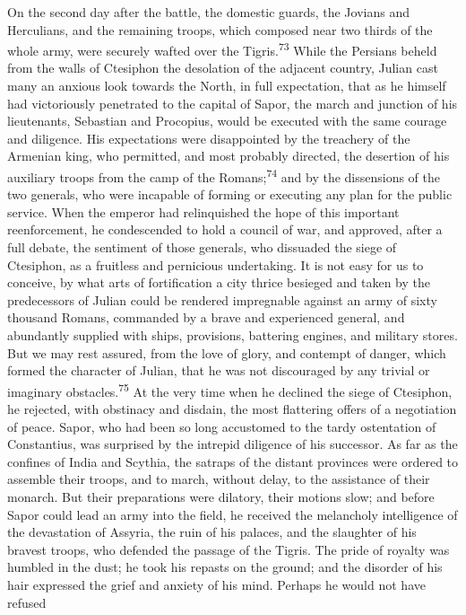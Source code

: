 On the second day after the battle, the domestic guards, the
Jovians and Herculians, and the remaining troops, which composed
near two thirds of the whole army, were securely wafted over the
Tigris.\textsuperscript{73} While the Persians beheld from the walls of Ctesiphon
the desolation of the adjacent country, Julian cast many an
anxious look towards the North, in full expectation, that as he
himself had victoriously penetrated to the capital of Sapor, the
march and junction of his lieutenants, Sebastian and Procopius,
would be executed with the same courage and diligence. His
expectations were disappointed by the treachery of the Armenian
king, who permitted, and most probably directed, the desertion of
his auxiliary troops from the camp of the Romans;\textsuperscript{74} and by the
dissensions of the two generals, who were incapable of forming or
executing any plan for the public service. When the emperor had
relinquished the hope of this important reenforcement, he
condescended to hold a council of war, and approved, after a full
debate, the sentiment of those generals, who dissuaded the siege
of Ctesiphon, as a fruitless and pernicious undertaking. It is
not easy for us to conceive, by what arts of fortification a city
thrice besieged and taken by the predecessors of Julian could be
rendered impregnable against an army of sixty thousand Romans,
commanded by a brave and experienced general, and abundantly
supplied with ships, provisions, battering engines, and military
stores. But we may rest assured, from the love of glory, and
contempt of danger, which formed the character of Julian, that he
was not discouraged by any trivial or imaginary obstacles.\textsuperscript{75} At
the very time when he declined the siege of Ctesiphon, he
rejected, with obstinacy and disdain, the most flattering offers
of a negotiation of peace. Sapor, who had been so long accustomed
to the tardy ostentation of Constantius, was surprised by the
intrepid diligence of his successor. As far as the confines of
India and Scythia, the satraps of the distant provinces were
ordered to assemble their troops, and to march, without delay, to
the assistance of their monarch. But their preparations were
dilatory, their motions slow; and before Sapor could lead an army
into the field, he received the melancholy intelligence of the
devastation of Assyria, the ruin of his palaces, and the
slaughter of his bravest troops, who defended the passage of the
Tigris. The pride of royalty was humbled in the dust; he took his
repasts on the ground; and the disorder of his hair expressed the
grief and anxiety of his mind. Perhaps he would not have refused

